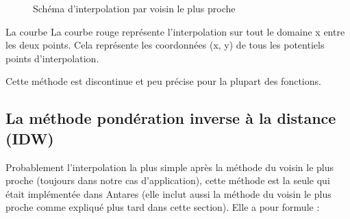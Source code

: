 \begin{figure}[ht!]
    \centering
    \caption{Schéma d'interpolation par voisin le plus proche}
    \label{fig:interpolation_voisin}
\end{figure}

La courbe La courbe rouge représente l'interpolation sur tout le domaine x entre les deux points. Cela représente les coordonnées (x, y) de tous les potentiels points d'interpolation.

Cette méthode est discontinue et peu précise pour la plupart des fonctions.



\subsection{La méthode pondération inverse à la distance (IDW)} %

Probablement l'interpolation la plus simple après la méthode du voisin le plus proche (toujours dans notre cas d'application), cette méthode est la seule qui était implémentée dans Antares (elle inclut aussi la méthode du voisin le plus proche comme expliqué plus tard dans cette section). Elle a pour formule :

